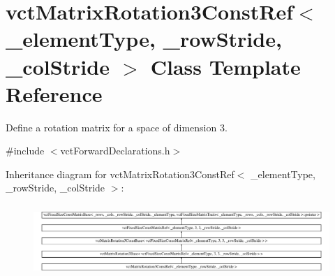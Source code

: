 \hypertarget{classvct_matrix_rotation3_const_ref}{\section{vct\-Matrix\-Rotation3\-Const\-Ref$<$ \-\_\-element\-Type, \-\_\-row\-Stride, \-\_\-col\-Stride $>$ Class Template Reference}
\label{classvct_matrix_rotation3_const_ref}
}


Define a rotation matrix for a space of dimension 3.  




{\ttfamily \#include $<$vct\-Forward\-Declarations.\-h$>$}

Inheritance diagram for vct\-Matrix\-Rotation3\-Const\-Ref$<$ \-\_\-element\-Type, \-\_\-row\-Stride, \-\_\-col\-Stride $>$\-:\begin{figure}[H]
\begin{center}
\leavevmode
\includegraphics[height=2.747792cm]{dd/d42/classvct_matrix_rotation3_const_ref}
\end{center}
\end{figure}
